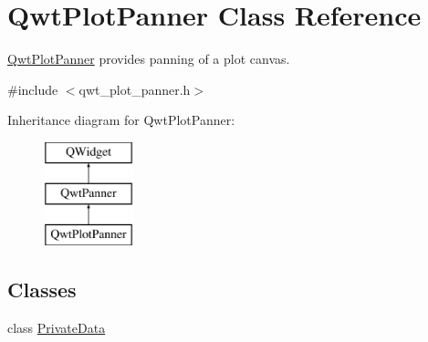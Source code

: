 \hypertarget{class_qwt_plot_panner}{\section{Qwt\-Plot\-Panner Class Reference}
\label{class_qwt_plot_panner}
}


\hyperlink{class_qwt_plot_panner}{Qwt\-Plot\-Panner} provides panning of a plot canvas.  




{\ttfamily \#include $<$qwt\-\_\-plot\-\_\-panner.\-h$>$}

Inheritance diagram for Qwt\-Plot\-Panner\-:\begin{figure}[H]
\begin{center}
\leavevmode
\includegraphics[height=3.000000cm]{class_qwt_plot_panner}
\end{center}
\end{figure}
\subsection*{Classes}
\begin{DoxyCompactItemize}
\item 
class \hyperlink{class_qwt_plot_panner_1_1_private_data}{Private\-Data}
\end{DoxyCompactItemize}
